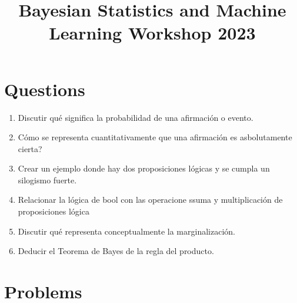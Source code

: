 \documentclass[12pt]{paper}
\title{\begin{center}Bayesian Statistics and Machine Learning Workshop 2023\end{center}}
\subtitle{\begin{center}\Large Fundamentals of Bayesian statistics\\ Martín Onetto \end{center}}
\begin{document}
\maketitle


\topmargin -2.0cm
\oddsidemargin -0.2cm
\evensidemargin -0.2cm

\vspace{-80pt}

\section{Questions}

\begin{enumerate}
\item Discutir qué significa la probabilidad de una afirmación o evento.
\item Cómo se representa cuantitativamente que una afirmación es asbolutamente cierta?
\item Crear un ejemplo donde hay dos proposiciones lógicas y se cumpla un silogismo fuerte.
\item Relacionar la lógica de bool con las operacione ssuma y multiplicación de proposiciones lógica
\item Discutir qué representa conceptualmente la marginalización.
\item Deducir el Teorema de Bayes de la regla del producto.
\end{enumerate}
\newpage
\section{Problems}
\end{document}
